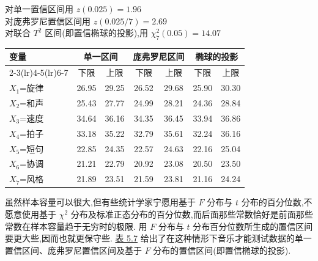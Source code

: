 \begin{mvtable}
\label{tab:5.6}
\begin{center}\small
对单一置信区间用 $z(0.025)=1.96$\\
对庞弗罗尼置信区间用 $z(0.025/7)=2.69$\\
对联合 $T^{2}$ 区间(即置信椭球的投影),用 $\chi_7^{2}(0.05)=14.07$
\end{center}
\begin{tabular}{lcccccc}
\toprule
\multirow{2}{*}{变量} & \multicolumn{2}{c}{单一区间} & \multicolumn{2}{c}{庞弗罗尼区间} & \multicolumn{2}{c}{椭球的投影}\\
\cmidrule(lr){2-3}\cmidrule(lr){4-5}\cmidrule(lr){6-7}
 & 下限 & 上限 & 下限 & 上限 & 下限 & 上限\\
\midrule
$X_1$=旋律 & 26.95 & 29.25 & 26.52 & 29.68 & 25.90 & 30.30\\
$X_2$=和声 & 25.43 & 27.77 & 24.99 & 28.21 & 24.36 & 28.84\\
$X_3$=速度 & 34.64 & 36.16 & 34.35 & 36.45 & 33.94 & 36.86\\
$X_4$=拍子 & 33.18 & 35.22 & 32.79 & 35.61 & 32.24 & 36.16\\
$X_5$=短句 & 22.85 & 24.35 & 22.57 & 24.63 & 22.16 & 25.04\\
$X_6$=协调 & 21.21 & 22.79 & 20.92 & 23.08 & 20.50 & 23.50\\
$X_7$=风格 & 21.89 & 23.51 & 21.59 & 23.81 & 21.16 & 24.24\\
\bottomrule
\end{tabular}
\end{mvtable}

虽然样本容量可以很大,但有些统计学家宁愿用基于 $F$ 分布与 $t$ 分布的百分位数,不愿意使用基于 $\chi^{2}$ 分布及标准正态分布的百分位数,而后面那些常数恰好是前面那些常数在样本容量趋于无穷时的极限. 用 $F$ 分布与 $t$ 分布百分位数所生成的置信区间要更大些,因而也就更保守些. \hyperref[tab:5.7]{表 5.7} 给出了在这种情形下音乐才能测试数据的单一置信区间、庞弗罗尼置信区间及基于 $F$ 分布的置信区间(即置信椭球的投影).

